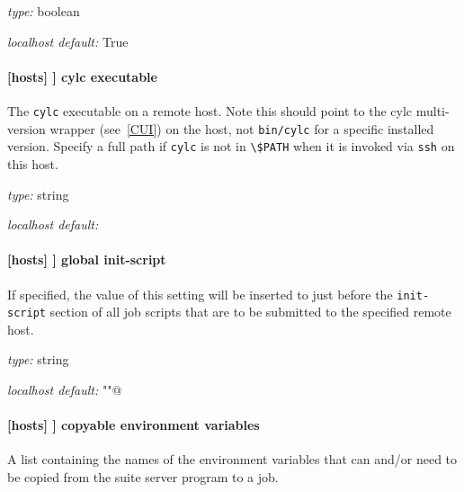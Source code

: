 \begin{myitemize}
\item {\em type:} boolean
\item {\em localhost default:} True
\end{myitemize}

\paragraph[cylc executable]{[hosts] \textrightarrow [[HOST]] \textrightarrow cylc executable }

The \lstinline=cylc= executable on a remote host. Note this should point to the
cylc multi-version wrapper (see~\ref{CUI}) on the host, not
\lstinline=bin/cylc= for a specific installed version.
Specify a full path if \lstinline=cylc= is not in \lstinline=\$PATH= when it is
invoked via \lstinline=ssh= on this host.

\begin{myitemize}
\item {\em type:} string
\item {\em localhost default:} \lstinline@cylc@
\end{myitemize}

\paragraph[global init-script]{[hosts] \textrightarrow [[HOST]] \textrightarrow global init-script }
\label{GlobalInitScript}

If specified, the value of this setting will be inserted to just before the
\lstinline=init-script= section of all job scripts that are to be
submitted to the specified remote host.

\begin{myitemize}
\item {\em type:} string
\item {\em localhost default:} \lstinline@""@
\end{myitemize}

\paragraph[copyable environment variables]{[hosts] \textrightarrow [[HOST]] \textrightarrow copyable environment variables }

A list containing the names of the environment variables that can and/or need
to be copied from the suite server program to a job.


